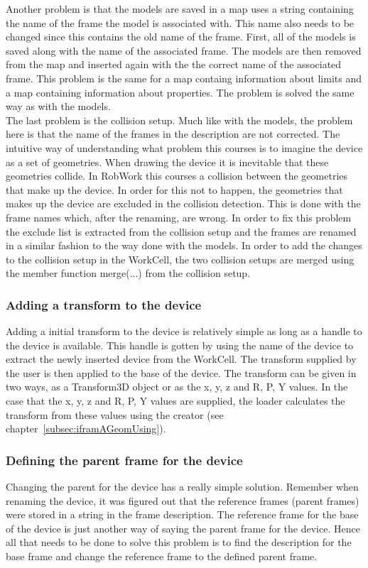 Another problem is that the models are saved in a map uses a string containing the name of the frame the model is associated with. This name also needs to be changed since this contains the old name of the frame. First, all of the models is saved along with the name of the associated frame. The models are then removed from the map and inserted again with the the correct name of the associated frame. This problem is the same for a map containg information about limits and a map containing information about properties. The problem is solved the same way as with the models.\\

The last problem is the collision setup. Much like with the models, the problem here is that the name of the frames in the description are not corrected. The intuitive way of understanding what problem this courses is to imagine the device as a set of geometries. When drawing the device it is inevitable that these geometries collide. In RobWork this courses a collision between the geometries that make up the device. In order for this not to happen, the geometries that makes up the device are excluded in the collision detection. This is done with the frame names which, after the renaming, are wrong. In order to fix this problem the exclude list is extracted from the collision setup and the frames are renamed in a similar fashion to the way done with the models. In order to add the changes to the collision setup in the WorkCell, the two collision setups are merged using the member function merge(...) from the collision setup.

\subsubsection{Adding a transform to the device}
Adding a initial transform to the device is relatively simple as long as a handle to the device is available. This handle is gotten by using the name of the device to extract the newly inserted device from the WorkCell. The transform supplied by the user is then applied to the base of the device. The transform can be given in two ways, as a Transform3D object or as the x, y, z and R, P, Y values. In the case that the x, y, z and R, P, Y values are supplied, the loader calculates the transform from these values using the creator (see chapter~\ref{subsec:iframAGeomUsing}).

\subsubsection{Defining the parent frame for the device}
Changing the parent for the device has a really simple solution. Remember when renaming the device, it was figured out that the reference frames (parent frames) were stored in a string in the frame description. The reference frame for the base of the device is just another way of saying the parent frame for the device. Hence all that needs to be done to solve this problem is to find the description for the base frame and change the reference frame to the defined parent frame.


